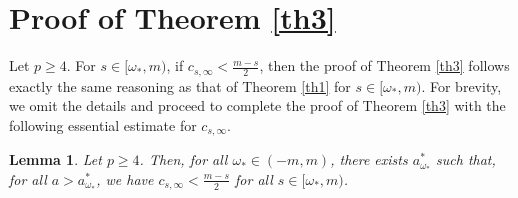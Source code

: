 \documentclass[11pt]{amsart}
\newtheorem{lemma}[theorem]{Lemma}
\numberwithin{equation}{section}
\begin{document}
\section{Proof of Theorem \ref{th3}}\label{sect5}
 Let $p \geq 4$. For $s \in [\omega_*,m)$, if $c_{s,\infty} < \frac{m-s}{2}$, then the proof of Theorem \ref{th3} follows exactly the same  reasoning as that of Theorem \ref{th1}  for $s\in [\omega_*,m)$. For brevity, we omit the details and proceed to complete the proof of Theorem \ref{th3} with the following essential estimate for $c_{s,\infty}$.
\begin{lemma}\label{lemcinsup}
    Let $p \geq 4$. Then, for all $\omega_* \in (-m,m)$, there exists $a^*_{\omega_*}$ such that, for all $a>a^*_{\omega_*}$, we have $c_{s,\infty} < \frac{m-s}{2}$ for all $s\in [\omega_*,m)$.
\end{lemma}
\end{document}
